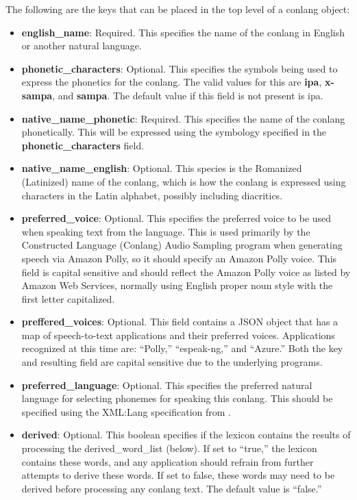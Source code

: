 The following are the keys that can be placed in the top level of a conlang object:
\begin{itemize}
	\item \textbf{english\_name}: Required.  This specifies the name of the conlang in English or another natural language.
	\item \textbf{phonetic\_characters}: Optional.  This specifies the symbols being used to express the phonetics for the conlang.  The valid values for this are \textbf{ipa}, \textbf{x-sampa}, and \textbf{sampa}.  The default value if this field is not present is ipa.
	\item \textbf{native\_name\_phonetic}: Required. This specifies the name of the conlang phonetically.  This will be expressed using the symbology specified in the \textbf{phonetic\_characters} field.
	\item \textbf{native\_name\_english}: Optional.  This species is the Romanized (Latinized) name of the conlang, which is how the conlang is expressed using characters in the Latin alphabet, possibly including diacritics.
	\item \textbf{preferred\_voice}: Optional. This specifies the preferred voice to be used when speaking text from the language.  This is used primarily by the Constructed Language (Conlang) Audio Sampling program when generating speech via Amazon Polly, so it should specify an Amazon Polly voice.  This field is capital sensitive and should reflect the Amazon Polly voice as listed by Amazon Web Services, normally using English proper noun style with the first letter capitalized.
	\item \textbf{preffered\_voices}: Optional.  This field contains a JSON object that has a map of speech-to-text applications and their preferred voices.  Applications recognized at this time are: ``Polly,'' ``espeak-ng,'' and ``Azure.''  Both the key and resulting field are capital sensitive due to the underlying programs.
	\item \textbf{preferred\_language}: Optional.  This specifies the preferred natural language for selecting phonemes for speaking this conlang.  This should be specified using the XML:Lang specification from \cite{froumentinW3CSpeechInterface2005}.
	\item \textbf{derived}: Optional. This boolean specifies if the lexicon contains the results of processing the derived\_word\_list (below).  If set to ``true,'' the lexicon contains these words, and any application should refrain from further attempts to derive these words.  If set to false, these words may need to be derived before processing any conlang text.  The default value is ``false.''

\end{itemize}
